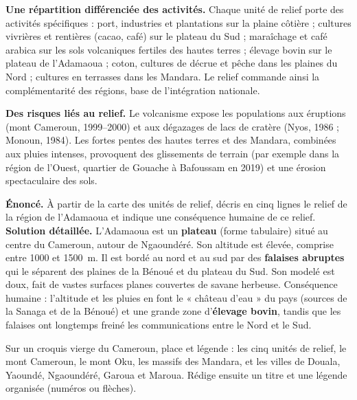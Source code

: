 \documentclass[11pt]{article}
\newcommand{\cle}[1]{{\popxbold\color{popdark}#1}}
\begin{document}
\textbf{Une répartition différenciée des activités.} Chaque unité de relief porte des activités spécifiques : port, industries et plantations sur la plaine côtière ; cultures vivrières et rentières (cacao, café) sur le plateau du Sud ; maraîchage et café arabica sur les sols volcaniques fertiles des hautes terres ; élevage bovin sur le plateau de l'Adamaoua ; coton, cultures de décrue et pêche dans les plaines du Nord ; cultures en terrasses dans les Mandara. Le relief commande ainsi la \cle{complémentarité des régions}, base de l'intégration nationale.

\textbf{Des risques liés au relief.} Le volcanisme expose les populations aux \cle{éruptions} (mont Cameroun, 1999--2000) et aux dégazages de lacs de cratère (Nyos, 1986 ; Monoun, 1984). Les fortes pentes des hautes terres et des Mandara, combinées aux pluies intenses, provoquent des \cle{glissements de terrain} (par exemple dans la région de l'Ouest, quartier de Gouache à Bafoussam en 2019) et une érosion spectaculaire des sols.

\begin{exoresolu}
\textbf{Énoncé.} À partir de la carte des unités de relief, décris en cinq lignes le relief de la région de l'Adamaoua et indique une conséquence humaine de ce relief.
\tcblower
\textbf{Solution détaillée.} L'Adamaoua est un \textbf{plateau} (forme tabulaire) situé au centre du Cameroun, autour de Ngaoundéré. Son altitude est élevée, comprise entre \num{1000} et \SI{1500}{m}. Il est bordé au nord et au sud par des \textbf{falaises abruptes} qui le séparent des plaines de la Bénoué et du plateau du Sud. Son modelé est doux, fait de vastes surfaces planes couvertes de savane herbeuse. Conséquence humaine : l'altitude et les pluies en font le « château d'eau » du pays (sources de la Sanaga et de la Bénoué) et une grande zone d'\textbf{élevage bovin}, tandis que les falaises ont longtemps freiné les communications entre le Nord et le Sud.
\end{exoresolu}

\begin{exercice}
Sur un croquis vierge du Cameroun, place et légende : les cinq unités de relief, le mont Cameroun, le mont Oku, les massifs des Mandara, et les villes de Douala, Yaoundé, Ngaoundéré, Garoua et Maroua. Rédige ensuite un titre et une légende organisée (numéros ou flèches).
\end{exercice}
\end{document}
